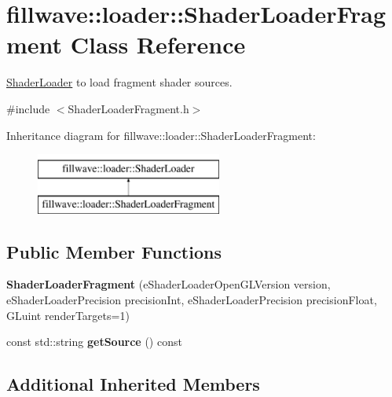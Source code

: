 \hypertarget{classfillwave_1_1loader_1_1ShaderLoaderFragment}{}\section{fillwave\+:\+:loader\+:\+:Shader\+Loader\+Fragment Class Reference}
\label{classfillwave_1_1loader_1_1ShaderLoaderFragment}


\hyperlink{classfillwave_1_1loader_1_1ShaderLoader}{Shader\+Loader} to load fragment shader sources.  




{\ttfamily \#include $<$Shader\+Loader\+Fragment.\+h$>$}

Inheritance diagram for fillwave\+:\+:loader\+:\+:Shader\+Loader\+Fragment\+:\begin{figure}[H]
\begin{center}
\leavevmode
\includegraphics[height=2.000000cm]{classfillwave_1_1loader_1_1ShaderLoaderFragment}
\end{center}
\end{figure}
\subsection*{Public Member Functions}
\begin{DoxyCompactItemize}
\item 
\hypertarget{classfillwave_1_1loader_1_1ShaderLoaderFragment_afd527a3527e25796610a51fcaa4cc8c4}{}{\bfseries Shader\+Loader\+Fragment} (e\+Shader\+Loader\+Open\+G\+L\+Version version, e\+Shader\+Loader\+Precision precision\+Int, e\+Shader\+Loader\+Precision precision\+Float, G\+Luint render\+Targets=1)\label{classfillwave_1_1loader_1_1ShaderLoaderFragment_afd527a3527e25796610a51fcaa4cc8c4}

\item 
\hypertarget{classfillwave_1_1loader_1_1ShaderLoaderFragment_a3c5b7fa214cd459a29609db21365fb44}{}const std\+::string {\bfseries get\+Source} () const \label{classfillwave_1_1loader_1_1ShaderLoaderFragment_a3c5b7fa214cd459a29609db21365fb44}

\end{DoxyCompactItemize}
\subsection*{Additional Inherited Members}


